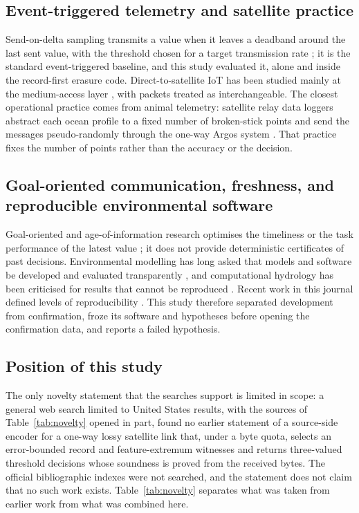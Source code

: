\subsection{Event-triggered telemetry and satellite practice}
Send-on-delta sampling transmits a value when it leaves a deadband around the last sent value, with the threshold chosen for a target transmission rate \citep{diazcacho2017sod}; it is the standard event-triggered baseline, and this study evaluated it, alone and inside the record-first erasure code. Direct-to-satellite IoT has been studied mainly at the medium-access layer \citep{capez2022,tondo2021,alvarez2022,afhamisis2022,rathi2025}, with packets treated as interchangeable. The closest operational practice comes from animal telemetry: satellite relay data loggers abstract each ocean profile to a fixed number of broken-stick points and send the messages pseudo-randomly through the one-way Argos system \citep{boehme2009,photopoulou2015}. That practice fixes the number of points rather than the accuracy or the decision.

\subsection{Goal-oriented communication, freshness, and reproducible environmental software}
Goal-oriented and age-of-information research optimises the timeliness or the task performance of the latest value \citep{yates2021,chen2021,talli2026}; it does not provide deterministic certificates of past decisions. Environmental modelling has long asked that models and software be developed and evaluated transparently \citep{jakeman2006}, and computational hydrology has been criticised for results that cannot be reproduced \citep{hutton2016}. Recent work in this journal defined levels of reproducibility \citep{essawy2020,choi2021}. This study therefore separated development from confirmation, froze its software and hypotheses before opening the confirmation data, and reports a failed hypothesis.

\subsection{Position of this study}
The only novelty statement that the searches support is limited in scope: a general web search limited to United States results, with the sources of Table~\ref{tab:novelty} opened in part, found no earlier statement of a source-side encoder for a one-way lossy satellite link that, under a byte quota, selects an error-bounded record and feature-extremum witnesses and returns three-valued threshold decisions whose soundness is proved from the received bytes. The official bibliographic indexes were not searched, and the statement does not claim that no such work exists. Table~\ref{tab:novelty} separates what was taken from earlier work from what was combined here.

